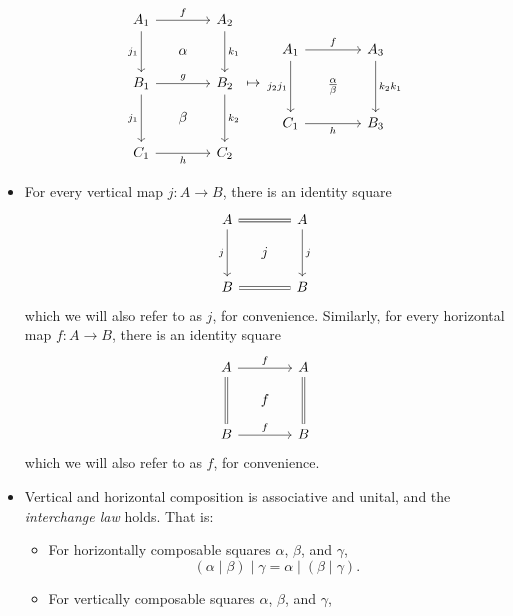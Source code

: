 \documentclass[DynamicalBook]{subfiles}
\begin{document}
\begin{definition}
\begin{itemize}
\[\begin{tikzcd}[sep=small]
        \end{tikzcd}
        \]
        \[
        \begin{tikzcd}[sep=small]
          A_1 \ar[dd, "j_1"'] \ar[rr, "f"] & & A_2 \ar[dd, "k_1"]  \\
           & \alpha &  \\
           B_1 \ar[dd, "j_1"'] \ar[rr, "g"] & & B_2 \ar[dd, "k_2"]\\
           & \beta & \\
           C_1 \ar[rr, "h"']& & C_2
        \end{tikzcd} \mapsto
        \begin{tikzcd}[sep=small]
          A_1 \ar[dd, "j_2 j_1"'] \ar[rr, "f"] & & A_3 \ar[dd, "k_2 k_1"] \\
           & \frac{\alpha}{\beta} & \\
          C_1 \ar[rr, "h"'] & & B_3
        \end{tikzcd}
        \]
      \item For every vertical map $j : A \to B$, there is an identity square
        \[
        \begin{tikzcd}[sep=small]
          A \ar[dd, "j"'] \ar[rr, equals] & & A \ar[dd, "j"] \\
           & j & \\
          B \ar[rr, equals] & & B
        \end{tikzcd}
        \]
        which we will also refer to as $j$, for convenience. Similarly, for
        every horizontal map $f : A \to B$, there is an identity square
        \[
        \begin{tikzcd}[sep=small]
          A \ar[rr, "f"] \ar[dd, equals] & & A \ar[dd, equals] \\
           & f & \\
          B \ar[rr, "f"] & & B
        \end{tikzcd}
        \]
        which we will also refer to as $f$, for convenience.
      \item Vertical and horizontal composition is associative and unital, and
        the \emph{interchange law} holds. That is:
        \begin{itemize}
          \item For horizontally composable squares $\alpha$, $\beta$, and
            $\gamma$, $$(\alpha \mid \beta) \mid \gamma = \alpha \mid (\beta \mid
            \gamma).$$
          \item For vertically composable squares $\alpha$, $\beta$, and
            $\gamma$,%

\end{itemize}
\end{itemize}
\end{definition}
\end{document}
